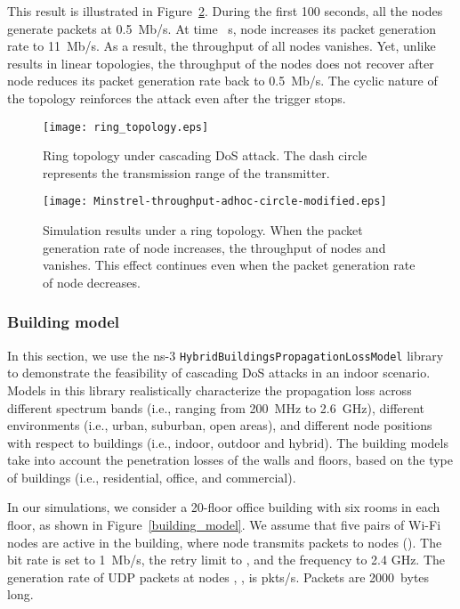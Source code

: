 \documentclass{IEEEtran}
\begin{document}
This result is illustrated in Figure~\ref{Simulation Result with Minstrel Rate Adaptation circle}.
During the first 100 seconds, all the nodes   generate packets at 0.5~Mb/s. At time ~s, node  increases its packet generation
rate to 11~Mb/s. As a result, the throughput of all nodes vanishes. Yet, unlike results in linear topologies, the throughput of the nodes does not
recover
after node  reduces its packet generation rate back to 0.5~Mb/s. The cyclic nature of the topology reinforces the attack even after the trigger
stops.

\begin{figure}[!t]
\centering
\texttt{[image: ring\_topology.eps]}
\caption{Ring topology under cascading DoS attack. The dash circle represents the transmission range of the transmitter.}
\label{ring_topology}
\end{figure}

\begin{figure}[!t]
\centering
\texttt{[image: Minstrel-throughput-adhoc-circle-modified.eps]}
\caption{Simulation results under a ring topology. When the packet generation rate of node
   increases, the throughput of nodes  and 
  vanishes. This effect continues even when the packet generation rate of node  decreases.}
\label{Simulation Result with Minstrel Rate Adaptation circle}
\end{figure}


\subsubsection{Building model} \label{Building model}
In this section, we use the ns-3  {\tt HybridBuildingsPropagationLossModel} library~\cite{ns3hybridbuildingspropagationlossmodel} to demonstrate the feasibility of cascading DoS attacks in an indoor scenario. Models in this library realistically characterize the propagation loss across different spectrum bands (i.e., ranging from 200~MHz to 2.6~GHz), different environments (i.e., urban, suburban, open areas), and different node positions with respect to buildings (i.e., indoor, outdoor and hybrid). The building models take into account the penetration losses of the walls and floors, based on the type of buildings (i.e., residential, office, and commercial).


In our simulations, we consider a 20-floor office building with six rooms in each floor, as shown in Figure~\ref{building_model}.  We assume that five pairs of Wi-Fi nodes  are active in the building, where node  transmits packets to nodes  (). The bit rate is set to 1~Mb/s, the retry limit to , and the frequency to 2.4 GHz.  The generation rate of UDP packets at nodes , ,  is  pkts/s.  Packets are 2000~bytes long.
\end{document}
